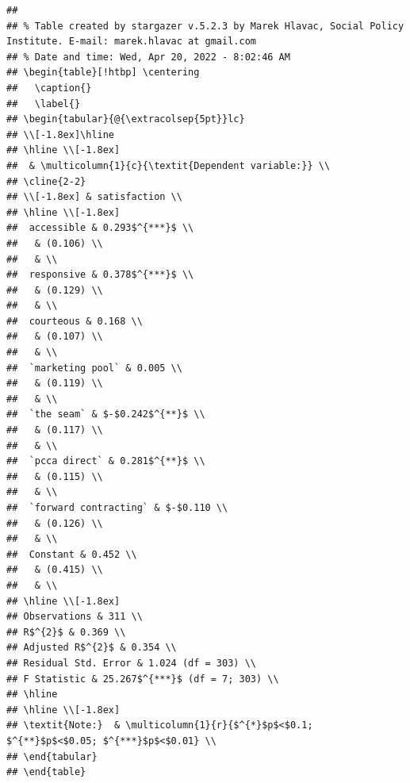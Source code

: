 \documentclass[
]{article}
\begin{document}
\begin{verbatim}
## 
## % Table created by stargazer v.5.2.3 by Marek Hlavac, Social Policy Institute. E-mail: marek.hlavac at gmail.com
## % Date and time: Wed, Apr 20, 2022 - 8:02:46 AM
## \begin{table}[!htbp] \centering 
##   \caption{} 
##   \label{} 
## \begin{tabular}{@{\extracolsep{5pt}}lc} 
## \\[-1.8ex]\hline 
## \hline \\[-1.8ex] 
##  & \multicolumn{1}{c}{\textit{Dependent variable:}} \\ 
## \cline{2-2} 
## \\[-1.8ex] & satisfaction \\ 
## \hline \\[-1.8ex] 
##  accessible & 0.293$^{***}$ \\ 
##   & (0.106) \\ 
##   & \\ 
##  responsive & 0.378$^{***}$ \\ 
##   & (0.129) \\ 
##   & \\ 
##  courteous & 0.168 \\ 
##   & (0.107) \\ 
##   & \\ 
##  `marketing pool` & 0.005 \\ 
##   & (0.119) \\ 
##   & \\ 
##  `the seam` & $-$0.242$^{**}$ \\ 
##   & (0.117) \\ 
##   & \\ 
##  `pcca direct` & 0.281$^{**}$ \\ 
##   & (0.115) \\ 
##   & \\ 
##  `forward contracting` & $-$0.110 \\ 
##   & (0.126) \\ 
##   & \\ 
##  Constant & 0.452 \\ 
##   & (0.415) \\ 
##   & \\ 
## \hline \\[-1.8ex] 
## Observations & 311 \\ 
## R$^{2}$ & 0.369 \\ 
## Adjusted R$^{2}$ & 0.354 \\ 
## Residual Std. Error & 1.024 (df = 303) \\ 
## F Statistic & 25.267$^{***}$ (df = 7; 303) \\ 
## \hline 
## \hline \\[-1.8ex] 
## \textit{Note:}  & \multicolumn{1}{r}{$^{*}$p$<$0.1; $^{**}$p$<$0.05; $^{***}$p$<$0.01} \\ 
## \end{tabular} 
## \end{table}
\end{verbatim}
\end{document}
